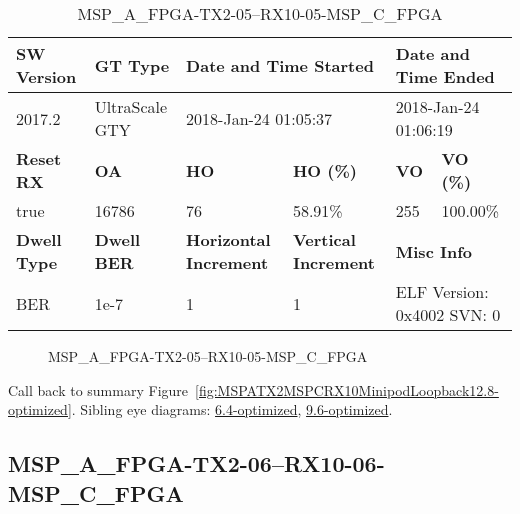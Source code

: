 \begin{table}[h]
\centering
\caption{MSP\_A\_FPGA-TX2-05--RX10-05-MSP\_C\_FPGA}
\label{tab:MSPAFPGATX205RX1005MSPCFPGA12.8-optimized}
\begin{tabular}{@{}|l|l|l|l|l|l|@{}}
\toprule
\textbf{SW Version}                & \textbf{GT Type}   & \multicolumn{2}{l|}{\textbf{Date and Time Started}}            & \multicolumn{2}{l|}{\textbf{Date and Time Ended}}        \\ \midrule
2017.2                       & UltraScale GTY          & \multicolumn{2}{l|}{2018-Jan-24 01:05:37}                   & \multicolumn{2}{l|}{2018-Jan-24 01:06:19}               \\ \midrule
\textbf{Reset RX}                  & \textbf{OA} & \textbf{HO}   & \textbf{HO (\%)} & \textbf{VO} & \textbf{VO (\%)} \\ \midrule
true & 16786        & 76          & 58.91\%        & 255        & 100.00\%       \\ \midrule
\textbf{Dwell Type}                & \textbf{Dwell BER} & \textbf{Horizontal Increment} & \textbf{Vertical Increment}    & \multicolumn{2}{l|}{\textbf{Misc Info}}                  \\ \midrule
BER                            & 1e-7        & 1        & 1           & \multicolumn{2}{l|}{ELF Version: 0x4002 SVN: 0}                         \\ \bottomrule
\end{tabular}
\end{table}

\begin{figure}[h]
\caption{MSP\_A\_FPGA-TX2-05--RX10-05-MSP\_C\_FPGA} \label{fig:MSPAFPGATX205RX1005MSPCFPGA12.8-optimized}
\end{figure}

Call back to summary Figure~\ref{fig:MSPATX2MSPCRX10MinipodLoopback12.8-optimized}.
Sibling eye diagrams: \hyperref[sec:MSPAFPGATX205RX1005MSPCFPGA6.4-optimized]{6.4-optimized}, \hyperref[sec:MSPAFPGATX205RX1005MSPCFPGA9.6-optimized]{9.6-optimized}.

\clearpage
\newpage


\subsection{MSP\_A\_FPGA-TX2-06--RX10-06-MSP\_C\_FPGA}\label{sec:MSPAFPGATX206RX1006MSPCFPGA12.8-optimized}

